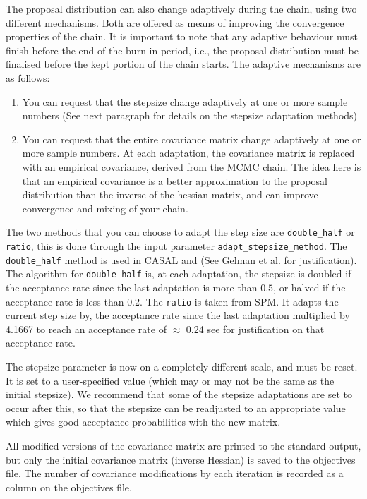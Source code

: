The proposal distribution can also change adaptively during the chain, using two different mechanisms. Both are offered as means of improving the convergence properties of the chain. It is important to note that any adaptive behaviour must finish before the end of the burn-in period, i.e., the proposal distribution must be finalised before the kept portion of the chain starts. The adaptive mechanisms are as follows: 

\begin{enumerate}
\item You can request that the stepsize change adaptively at one or more sample numbers (See next paragraph for details on the stepsize adaptation methods)

\item You can request that the entire covariance matrix change adaptively at one or more sample numbers. At each adaptation, the covariance matrix is replaced with an empirical covariance, derived from the MCMC chain. The idea here is that an empirical covariance is a better approximation to the proposal distribution than the inverse of the hessian matrix, and can improve convergence and mixing of your chain.
\end{enumerate}

The two methods that you can choose to adapt the step size are \texttt{double\_half} or \texttt{ratio}, this is done through the input parameter \texttt{adapt\_stepsize\_method}. The \texttt{double\_half} method is used in CASAL and (See Gelman et al. \citep{823} for justification). The algorithm for \texttt{double\_half} is, at each adaptation, the stepsize is doubled if the acceptance rate since the last adaptation is more than $0.5$, or halved if the acceptance rate is less than $0.2$. The \texttt{ratio} is taken from SPM. It adapts the current step size by, the acceptance rate since the last adaptation multiplied by 4.1667 to reach an acceptance rate of $\approx$ 0.24 see \cite{mcmc_rate} for justification on that acceptance rate.

The stepsize parameter is now on a completely different scale, and must be reset. It is set to a user-specified value (which may or may not be the same as the initial stepsize). We recommend that some of the stepsize adaptations are set to occur after this, so that the stepsize can be readjusted to an appropriate value which gives good acceptance probabilities with the new matrix. 

All modified versions of the covariance matrix are printed to the standard output, but only the initial covariance matrix (inverse Hessian) is saved to the objectives file. The number of covariance modifications by each iteration is recorded as a column on the objectives file.  

